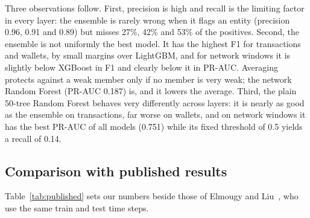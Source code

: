 Three observations follow. First, precision is high and recall is the limiting factor in every layer: the ensemble is rarely wrong when it flags an entity (precision 0.96, 0.91 and 0.89) but misses 27\%, 42\% and 53\% of the positives. Second, the ensemble is not uniformly the best model. It has the highest F1 for transactions and wallets, by small margins over LightGBM, and for network windows it is slightly below XGBoost in F1 and clearly below it in PR-AUC. Averaging protects against a weak member only if no member is very weak; the network Random Forest (PR-AUC 0.187) is, and it lowers the average. Third, the plain 50-tree Random Forest behaves very differently across layers: it is nearly as good as the ensemble on transactions, far worse on wallets, and on network windows it has the best PR-AUC of all models (0.751) while its fixed threshold of 0.5 yields a recall of 0.14.

\subsection{Comparison with published results}\label{sec:res-published}
Table~\ref{tab:published} sets our numbers beside those of Elmougy and Liu~\cite{elmougy2023}, who use the same train and test time steps.

